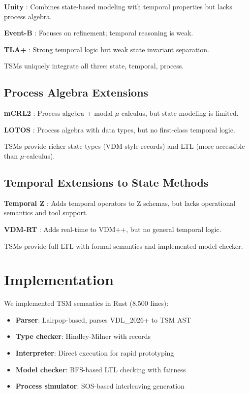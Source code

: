 \documentclass[conference]{IEEEtran}
\begin{document}
\textbf{Unity} \cite{chandy1988}: Combines state-based modeling with temporal properties but lacks process algebra.

\textbf{Event-B} \cite{abrial2010}: Focuses on refinement; temporal reasoning is weak.

\textbf{TLA+} \cite{lamport2002}: Strong temporal logic but weak state invariant separation.

TSMs uniquely integrate all three: state, temporal, process.

\subsection{Process Algebra Extensions}

\textbf{mCRL2} \cite{mcrl2}: Process algebra + modal $\mu$-calculus, but state modeling is limited.

\textbf{LOTOS} \cite{lotos}: Process algebra with data types, but no first-class temporal logic.

TSMs provide richer state types (VDM-style records) and LTL (more accessible than $\mu$-calculus).

\subsection{Temporal Extensions to State Methods}

\textbf{Temporal Z} \cite{temporal_z}: Adds temporal operators to Z schemas, but lacks operational semantics and tool support.

\textbf{VDM-RT} \cite{vdm_rt}: Adds real-time to VDM++, but no general temporal logic.

TSMs provide full LTL with formal semantics and implemented model checker.

\section{Implementation}

We implemented TSM semantics in Rust (8,500 lines):

\begin{itemize}
\item \textbf{Parser}: Lalrpop-based, parses VDL\_2026+ to TSM AST
\item \textbf{Type checker}: Hindley-Milner with records
\item \textbf{Interpreter}: Direct execution for rapid prototyping
\item \textbf{Model checker}: BFS-based LTL checking with fairness
\item \textbf{Process simulator}: SOS-based interleaving generation
\end{itemize}
\end{document}
